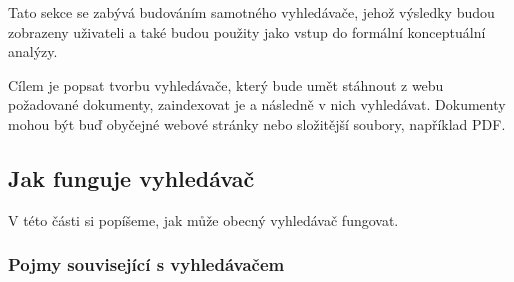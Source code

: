 \documentclass[12pt]{article}
\begin{document}
Tato sekce se zabývá budováním samotného vyhledávače, jehož výsledky budou zobrazeny uživateli a také budou použity jako vstup do formální konceptuální analýzy. 

Cílem je popsat tvorbu vyhledávače, který bude umět stáhnout z webu požadované dokumenty, zaindexovat je a následně v nich vyhledávat. Dokumenty mohou být buď obyčejné webové stránky nebo složitější soubory, například PDF. 

\subsection{Jak funguje vyhledávač}
V této části si popíšeme, jak může obecný vyhledávač fungovat. 

\subsubsection{Pojmy související s vyhledávačem}
\end{document}
